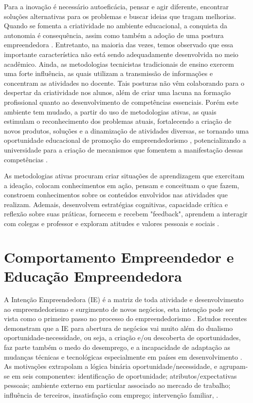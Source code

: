 Para a inovação é necessário autoeficácia, pensar e agir diferente, encontrar soluções alternativas para os problemas e buscar ideias que tragam melhorias. Quando se fomenta a criatividade no ambiente educacional, a conquista da autonomia é consequência, assim como também a adoção de uma postura empreendedora \cite{gonzalez_predictors_2009}. Entretanto, na maioria das vezes, temos observado que essa importante característica não está sendo adequadamente desenvolvida no meio acadêmico. Ainda, as metodologias tecnicistas tradicionais de ensino exercem uma forte influência, as quais utilizam a transmissão de informações e concentram as atividades no docente. Tais posturas não vêm colaborando para o despertar da criatividade nos alunos, além de criar uma lacuna na formação profissional quanto ao desenvolvimento de competências essenciais. Porém este ambiente tem mudado, a partir do uso de metodologias ativas, as quais estimulam o reconhecimento dos problemas atuais, fortalecendo a criação de novos produtos, soluções e a dinamização de atividades diversas, se tornando uma oportunidade educacional de promoção do empreendedorismo \cite{faria_promocao_2018}, potencializando a universidade para a criação de mecanismos que fomentem a manifestação dessas competências \cite{audy_innovation_2006}.

As metodologias ativas procuram criar situações de aprendizagem que exercitam a ideação, colocam conhecimentos em ação, pensam e conceituam o que fazem, constroem conhecimentos sobre os conteúdos envolvidos nas atividades que realizam. Ademais, desenvolvem estratégias cognitivas, capacidade crítica e reflexão sobre suas práticas, fornecem e recebem "feedback", aprendem a interagir com colegas e professor e exploram atitudes e valores pessoais e sociais \cite{berbel_as_2011}. 

\section{Comportamento Empreendedor e Educação Empreendedora}

A Intenção Empreendedora (IE) é a matriz de toda atividade e desenvolvimento ao empreendedorismo e surgimento de novos negócios, esta intenção pode ser vista como o primeiro passo no processo do empreendedorismo \cite{zhao_relationship_2010, shirokova_exploring_2016}. Estudos recentes demonstram que a IE para abertura de negócios vai muito além do dualismo oportunidade-necessidade, ou seja, a criação e/ou descoberta de oportunidades, faz parte também o medo do desemprego, e a incapacidade de adaptação as mudanças técnicas e tecnológicas especialmente em países em desenvolvimento \cite{vale_motivacoes_2014}. As motivações extrapolam a lógica binária oportunidade/necessidade, e agrupam-se em seis componentes: identificação de oportunidade; atributos/expectativas pessoais; ambiente externo em particular associado ao mercado de trabalho; influência de terceiros, insatisfação com emprego; intervenção familiar, \cite{vale_motivacoes_2014, rodrigues_intencao_2019,ferreira_intencao_2017}.


